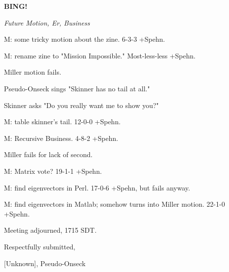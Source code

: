 \documentclass[12pt]{article}
\newcommand{\bing}{{\bf BING!} }
\newcommand{\goto}[1]{\bing \vskip 12pt \centerline{{\em{#1}}}}
\begin{document}
\goto{Future Motion, Er, Business}

M: some tricky motion about the zine. 6-3-3 +Spehn.

M: rename zine to "Mission Impossible." Most-less-less +Spehn.

Miller motion fails.

Pseudo-Onseck sings "Skinner has no tail at all."

Skinner asks "Do you really want me to show you?"

M: table skinner's tail. 12-0-0 +Spehn.

M: Recursive Business. 4-8-2 +Spehn.

Miller fails for lack of second.

M: Matrix vote? 19-1-1 +Spehn.

M: find eigenvectors in Perl. 17-0-6 +Spehn, but fails anyway.

M: find eigenvectors in Matlab; somehow turns into Miller motion. 22-1-0 +Spehn.

\vspace{12pt}

\noindent
Meeting adjourned, 1715 SDT.

\vspace{18pt}

\centerline{Respectfully submitted,}
\centerline{[Unknown], Pseudo-Onseck}
\end{document}
